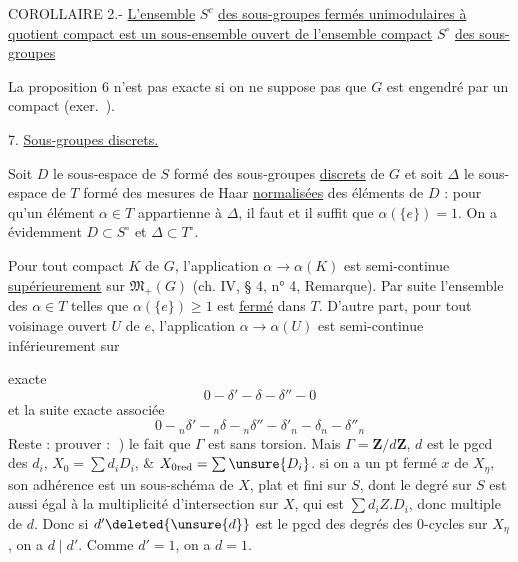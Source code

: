 COROLLAIRE 2.- \uline{L'ensemble} $S^c$ \uline{des sous-groupes fermés unimodulaires à quotient compact est un sous-ensemble ouvert de l'ensemble compact} $S^\circ$ \uline{des sous-groupes} 

La proposition 6 n'est pas exacte si on ne suppose pas que $G$ est engendré par un compact (exer.\ ).

7. \uline{Sous-groupes discrets.}

Soit $D$ le sous-espace de $S$ formé des sous-groupes \uline{discrets} de $G$ et soit $\Delta$ le sous-espace de $T$ formé des mesures de Haar \uline{normalisées} des éléments de $D$ : pour qu'un élément $\alpha\in T$ appartienne à $\Delta$, il faut et il suffit que $\alpha(\{e\})=1$. On a évidemment $D\subset S^\circ$ et $\Delta\subset T^\circ$.

Pour tout compact $K$ de $G$, l'application $\alpha\longrightarrow\alpha(K)$ est semi-continue \uline{supérieurement} sur $\mathfrak M_+(G)$ (ch. IV, § 4, n° 4, Remarque). Par suite l'ensemble des $\alpha\in T$ telles que $\alpha(\{e\})\geq 1$ est \uline{fermé} dans $T$. D'autre part, pour tout voisinage ouvert $U$ de $e$, l'application $\alpha\longrightarrow\alpha(U)$ est semi-continue inférieurement sur

exacte
\[
0\mathbin{-}\delta'\mathbin{-}\delta\mathbin{-}\delta''\mathbin{-}0
\]
et la suite exacte associée
\[
0\mathbin{-}{}_n\delta'\mathbin{-}{}_n\delta\mathbin{-}{}_n\delta''\mathbin{-}\delta'_n\mathbin{-}\delta_n\mathbin{-}\delta''_n
\]
Reste : prouver : \textcircled{}) le fait que $\Gamma$ est sans torsion. Mais $\Gamma=\mathbf Z/d\mathbf Z$,  $d$ est le pgcd des $d_i$, $X_0=\sum d_iD_i$, \& $X_{0\mathrm{red}}=\sum\unsure{D_i}$.  si on a un pt fermé $x$ de $X_\eta$, son adhérence  est un sous-schéma   de $X$, plat et fini sur $S$,  dont le degré sur $S$ est aussi égal à la multiplicité d'intersection  sur $X$, qui est $\sum d_iZ.D_i$, donc multiple de $d$. Donc si $d'\deleted{\unsure{d}}$ est le pgcd des degrés des 0-cycles sur $X_\eta$, on a $d\mid d'$. Comme $d'=1$, on a $d=1$.

